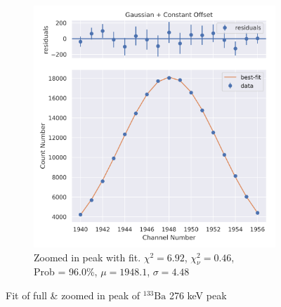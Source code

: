 \documentclass[11pt,a4paper]{article}
\newcommand{\element}[2]{$^{#2}\textrm{#1}$}
\begin{document}
\begin{figure}[H]
\begin{subfigure}{.5\linewidth}
    \includegraphics[width=\linewidth]{./Images/Barium133/Gauss/Gauss_4_Zoom.png}
    \caption{Zoomed in peak with fit. $\chi^2 = 6.92$, $\chi^2_\nu = 0.46$, \\ Prob = 96.0\%, $\mu = 1948.1$, $\sigma = 4.48$}
  \end{subfigure}
  \caption{Fit of full \& zoomed in peak of \element{Ba}{133} 276 keV peak}
\end{figure}
\end{document}
